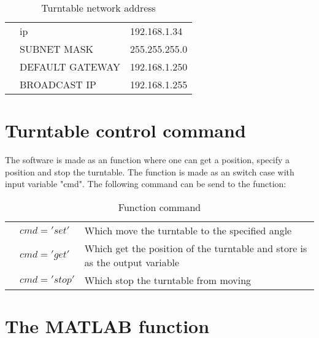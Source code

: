 \begin{table}[H]
\centering
\caption{Turntable network address}
\label{tab:turntable_network}
\begin{tabular}{lll}
 & \gls{ip} & 192.168.1.34   \\
 & SUBNET MASK  & 255.255.255.0   \\
 & DEFAULT GATEWAY  & 192.168.1.250  \\
 & BROADCAST IP   &  192.168.1.255   
\end{tabular}
\end{table}



\section*{Turntable control command}
The software is made as an function where one can get a position, specify a position and stop the turntable. The function is made as an switch case with input variable "cmd". The following command can be send to the function:

 \begin{table}[H]
\centering
\caption{Function command}
\label{my-label}
\begin{tabular}{lll}
 & $cmd = 'set'$ & Which move the turntable to the specified angle    \\
 & $cmd = 'get'$ & Which get the position of the turntable and store is as the output variable   \\
 & $cmd = 'stop'$  & Which stop the turntable from moving
\end{tabular}
\end{table}

\section*{The MATLAB function}




